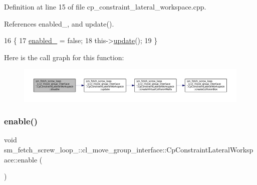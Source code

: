 Definition at line 15 of file cp\+\_\+constraint\+\_\+lateral\+\_\+workspace.\+cpp.



References enabled\+\_\+, and update().


\begin{DoxyCode}
16         \{
17             \hyperlink{classsm__fetch__screw__loop__1_1_1cl__move__group__interface_1_1CpConstraintLateralWorkspace_a28b477967db7dd372abf9ab95675130e}{enabled\_} = \textcolor{keyword}{false};
18             this->\hyperlink{classsm__fetch__screw__loop__1_1_1cl__move__group__interface_1_1CpConstraintLateralWorkspace_a42a932b985fa0e4f9f48e52b363bf6c2}{update}();
19         \}
\end{DoxyCode}
Here is the call graph for this function\+:
\nopagebreak
\begin{figure}[H]
\begin{center}
\leavevmode
\includegraphics[width=350pt]{classsm__fetch__screw__loop__1_1_1cl__move__group__interface_1_1CpConstraintLateralWorkspace_abc8e58c6bed792a56bfa9cad3f80d69e_cgraph}
\end{center}
\end{figure}
\mbox{\label{classsm__fetch__screw__loop__1_1_1cl__move__group__interface_1_1CpConstraintLateralWorkspace_a221dcce894e910dbfcbc58f80cacccdb}} 
\subsubsection{\texorpdfstring{enable()}{enable()}}
{\footnotesize\ttfamily void sm\+\_\+fetch\+\_\+screw\+\_\+loop\+\_\+::cl\+\_\+move\+\_\+group\+\_\+interface\+::\+Cp\+Constraint\+Lateral\+Workspace\+::enable (\begin{DoxyParamCaption}{ }\end{DoxyParamCaption})}



